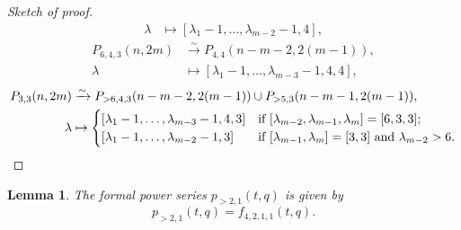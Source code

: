 \documentclass[a4paper, 12pt, reqno]{amsart}
\newtheorem{lemma}[theorem]{Lemma}
\theoremstyle{remark}
\numberwithin{equation}{subsection}
\begin{document}
\begin{proof}[Sketch of proof]
\begin{align*}
    \lambda &\mapsto [\lambda_1 - 1, \dots, \lambda_{m - 2} - 1, 4],
  \end{align*}
  \begin{align*}
    P_{6, 4, 3}(n, 2m) &\xrightarrow{\sim} P_{4, 4}(n - m - 2, 2(m - 1)), \\
    \lambda &\mapsto [\lambda_1 - 1, \dots, \lambda_{m - 3} - 1, 4, 4],
  \end{align*}
  \begin{align*}
    P_{3, 3}(n, 2m) &\xrightarrow{\sim} P_{>6, 4, 3}(n - m - 2, 2(m - 1)) \cup P_{>5, 3}(n - m - 1, 2(m - 1)), \\
    \lambda &\mapsto
              \begin{cases}
                [\lambda_1 - 1, \dots, \lambda_{m - 3} - 1, 4, 3] &\text{if }[\lambda_{m - 2}, \lambda_{m - 1}, \lambda_m] = [6, 3, 3]; \\
                [\lambda_1 - 1, \dots, \lambda_{m - 2} - 1, 3] &\text{if }[\lambda_{m - 1}, \lambda_m] = [3, 3]\text{ and }\lambda_{m - 2} > 6. \qedhere
              \end{cases}
  \end{align*}
\end{proof}

\begin{lemma}
  \label{lmm:37}
  The formal power series $p_{>2, 1}(t, q)$ is given by
  \begin{equation*}
    p_{>2, 1}(t, q) = f_{4, 2, 1, 1}(t, q).
  \end{equation*}
\end{lemma}
\end{document}

